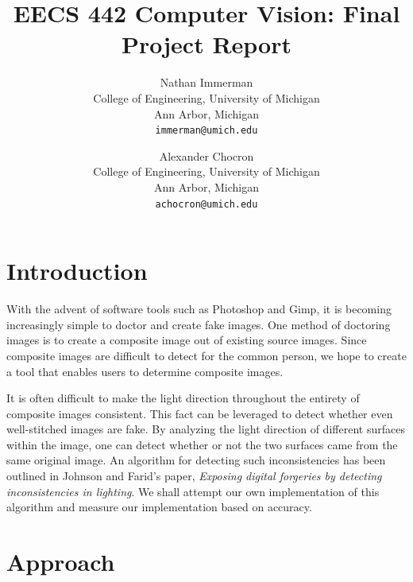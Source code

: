 \documentclass[10pt,twocolumn,letterpaper]{article}
\begin{document}
\title{EECS 442 Computer Vision: Final Project Report}

\author{Nathan Immerman\\
College of Engineering, University of Michigan\\
Ann Arbor, Michigan\\
{\tt\small immerman@umich.edu}
\and
Alexander Chocron\\
College of Engineering, University of Michigan\\
Ann Arbor, Michigan\\
{\tt\small achocron@umich.edu}
}

\maketitle

\section{Introduction}

With the advent of software tools such as Photoshop and Gimp, it is becoming increasingly simple to doctor and create fake images. One method of doctoring images is to create a composite image out of existing source images. Since composite images are difficult to detect for the common person, we hope to create a tool that enables users to determine composite images.

It is often difficult to make the light direction throughout the entirety of composite images consistent. This fact can be leveraged to detect whether even well-stitched images are fake. By analyzing the light direction of different surfaces within the image, one can detect whether or not the two surfaces came from the same original image. An algorithm for detecting such inconsistencies has been outlined in Johnson and Farid's paper, \emph{Exposing digital forgeries by detecting inconsistencies in lighting}. We shall attempt our own implementation of this algorithm and measure our implementation based on accuracy.

\section{Approach}
\end{document}

